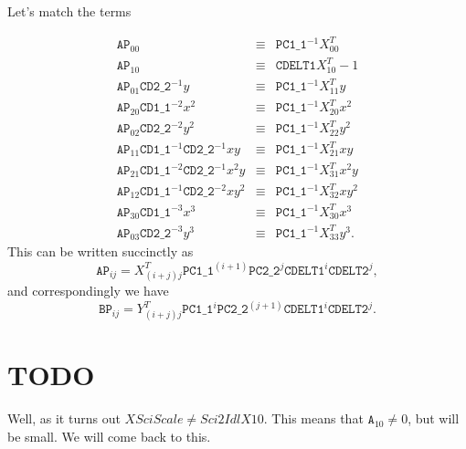 \documentclass[10pt]{article}
\newcommand{\sipA}[2]{\ensuremath{\mathtt{A}_{#1 #2}}}
\newcommand{\sipAP}[2]{\ensuremath{\mathtt{AP}_{#1 #2}}}
\newcommand{\sipBP}[2]{\ensuremath{\mathtt{BP}_{#1 #2}}}
\newcommand{\siafXP}[2]{\ensuremath{X^{T}_{#1 #2}}}
\newcommand{\siafYP}[2]{\ensuremath{Y^{T}_{#1 #2}}}
\newcommand{\NCu}{\ensuremath{\mathtt{PC1\_1}}}
\newcommand{\NCv}{\ensuremath{\mathtt{PC2\_2}}}
\newcommand{\CDu}{\ensuremath{\mathtt{CD1\_1}}}
\newcommand{\CDv}{\ensuremath{\mathtt{CD2\_2}}}
\begin{document}
Let's match the terms


\begin{eqnarray}
\label{eqn:matched_inv}
\sipAP{0}{0} &\equiv& \NCu^{-1} \siafXP{0}{0}\\
\sipAP{1}{0} &\equiv& \mathtt{CDELT1}\siafXP{1}{0} - 1 \\
\sipAP{0}{1} \CDv^{-1} y &\equiv& \NCu^{-1} \siafXP{1}{1} y \\
\sipAP{2}{0} \CDu^{-2} x^2 &\equiv& \NCu^{-1}  \siafXP{2}{0} x^2\\
\sipAP{0}{2} \CDv^{-2} y^2 &\equiv& \NCu^{-1} \siafXP{2}{2} y^2\\
\sipAP{1}{1} \CDu^{-1} \CDv^{-1} xy &\equiv&  \NCu^{-1} \siafXP{2}{1} xy \\
\sipAP{2}{1} \CDu^{-2}\CDv^{-1} x^2y &\equiv& \NCu^{-1} \siafXP{3}{1} x^2 y\\
\sipAP{1}{2} \CDu^{-1}\CDv^{-2} xy^2 &\equiv& \NCu^{-1} \siafXP{3}{2} xy^2 \\
\sipAP{3}{0} \CDu^{-3} x^3&\equiv& \NCu^{-1}  \siafXP{3}{0} x^3 \\
\sipAP{0}{3} \CDv^{-3} y^3&\equiv& \NCu^{-1}  \siafXP{3}{3} y^3.
\end{eqnarray}
\noindent
This can be written succinctly as
\begin{equation}
\sipAP{i}{j} = \siafXP{(i+j)}{j} \NCu^{(i+1)} \NCv^{j} \mathtt{CDELT1}^i \mathtt{CDELT2}^j,
\end{equation}
\noindent
and correspondingly we have
\begin{equation}
\sipBP{i}{j} = \siafYP{(i+j)}{j} \NCu^{i} \NCv^{(j+1)} \mathtt{CDELT1}^i \mathtt{CDELT2}^j.
\end{equation}

\section{TODO}

Well, as it turns out $XSciScale\ne Sci2IdlX10$.  This means that $\sipA{1}{0}\ne0$, but will be small. We will come back to this.
\end{document}
